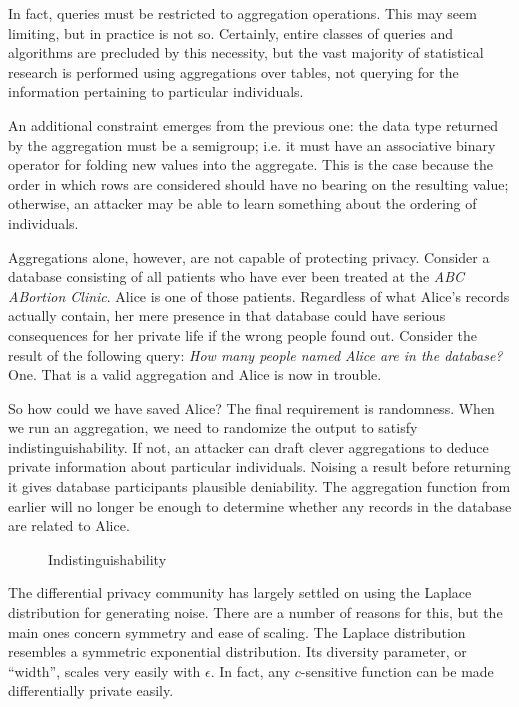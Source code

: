 \documentclass[12pt]{article}
\begin{document}
In fact, queries must be restricted to aggregation operations.
This may seem limiting, but in practice is not so.
Certainly, entire classes of queries and algorithms are precluded by this necessity, but the vast majority of statistical research is performed using aggregations over tables, not querying for the information pertaining to particular individuals.

An additional constraint emerges from the previous one: the data type returned by the aggregation must be a semigroup; i.e. it must have an associative binary operator for folding new values into the aggregate.
This is the case because the order in which rows are considered should have no bearing on the resulting value; otherwise, an attacker may be able to learn something about the ordering of individuals.

Aggregations alone, however, are not capable of protecting privacy.
Consider a database consisting of all patients who have ever been treated at the \textit{ABC ABortion Clinic}.
Alice is one of those patients.
Regardless of what Alice's records actually contain, her mere presence in that database could have serious consequences for her private life if the wrong people found out.
Consider the result of the following query: \textit{How many people named Alice are in the database?}
One.
That is a valid aggregation and Alice is now in trouble.

So how could we have saved Alice?
The final requirement is randomness.
When we run an aggregation, we need to randomize the output to satisfy indistinguishability.
If not, an attacker can draft clever aggregations to deduce private information about particular individuals.
Noising a result before returning it gives database participants plausible deniability.
The aggregation function from earlier will no longer be enough to determine whether any records in the database are related to Alice.

\begin{figure}
    \centering
    \def\svgwidth{\columnwidth}
    
    \caption{Indistinguishability}
\end{figure}

The differential privacy community has largely settled on using the Laplace distribution for generating noise.
There are a number of reasons for this, but the main ones concern symmetry and ease of scaling.
The Laplace distribution resembles a symmetric exponential distribution.
Its diversity parameter, or ``width'', scales very easily with $\epsilon$.
In fact, any $c$-sensitive function can be made differentially private easily.
\end{document}
